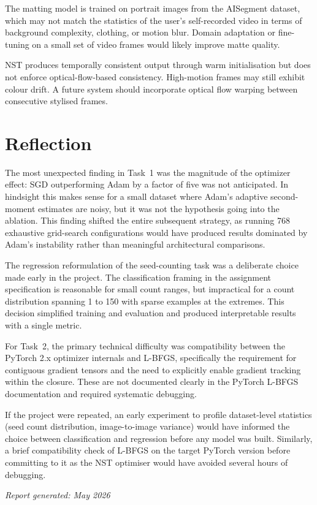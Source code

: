 The matting model is trained on portrait images from the AISegment dataset, which may
not match the statistics of the user's self-recorded video in terms of background
complexity, clothing, or motion blur. Domain adaptation or fine-tuning on a small set of
video frames would likely improve matte quality.

NST produces temporally consistent output through warm initialisation but does not
enforce optical-flow-based consistency. High-motion frames may still exhibit colour drift.
A future system should incorporate optical flow warping between consecutive stylised frames.

\section{Reflection}

The most unexpected finding in Task~1 was the magnitude of the optimizer effect: SGD
outperforming Adam by a factor of five was not anticipated. In hindsight this makes sense
for a small dataset where Adam's adaptive second-moment estimates are noisy, but it was
not the hypothesis going into the ablation. This finding shifted the entire subsequent
strategy, as running 768 exhaustive grid-search configurations would have produced results
dominated by Adam's instability rather than meaningful architectural comparisons.

The regression reformulation of the seed-counting task was a deliberate choice made early
in the project. The classification framing in the assignment specification is reasonable
for small count ranges, but impractical for a count distribution spanning 1 to 150 with
sparse examples at the extremes. This decision simplified training and evaluation and
produced interpretable results with a single metric.

For Task~2, the primary technical difficulty was compatibility between the PyTorch 2.x
optimizer internals and L-BFGS, specifically the requirement for contiguous gradient
tensors and the need to explicitly enable gradient tracking within the closure. These are
not documented clearly in the PyTorch L-BFGS documentation and required systematic
debugging.

If the project were repeated, an early experiment to profile dataset-level statistics
(seed count distribution, image-to-image variance) would have informed the choice between
classification and regression before any model was built. Similarly, a brief compatibility
check of L-BFGS on the target PyTorch version before committing to it as the NST
optimiser would have avoided several hours of debugging.

\bigskip
\begin{flushright}
\textit{Report generated: May 2026}
\end{flushright}


